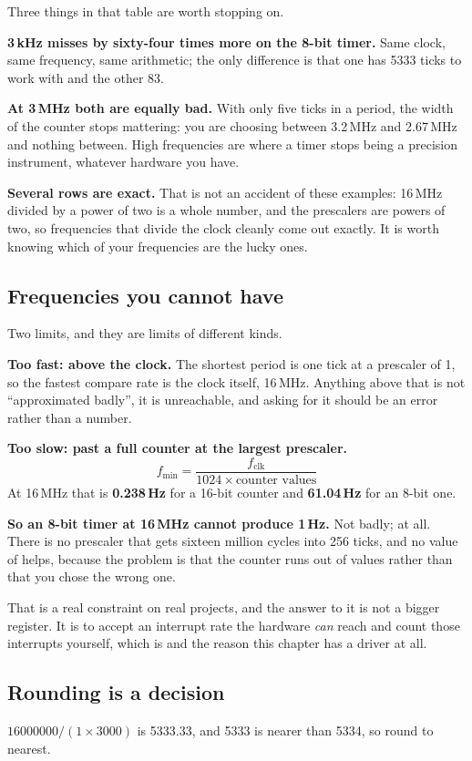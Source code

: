 Three things in that table are worth stopping on.

\textbf{3\,kHz misses by sixty-four times more on the 8-bit timer.} Same clock, same frequency, same
arithmetic; the only difference is that one has 5333 ticks to work with and the other 83.

\textbf{At 3\,MHz both are equally bad.} With only five ticks in a period, the width of the counter
stops mattering: you are choosing between 3.2\,MHz and 2.67\,MHz and nothing between. High
frequencies are where a timer stops being a precision instrument, whatever hardware you have.

\textbf{Several rows are exact.} That is not an accident of these examples: 16\,MHz divided by a
power of two is a whole number, and the prescalers are powers of two, so frequencies that divide
the clock cleanly come out exactly. It is worth knowing which of your frequencies are the lucky
ones.

\subsection{Frequencies you cannot have}
\label{c5:sec:cannot}
Two limits, and they are limits of different kinds.

\textbf{Too fast: above the clock.} The shortest period is one tick at a prescaler of 1, so the
fastest compare rate is the clock itself, 16\,MHz. Anything above that is not ``approximated
badly'', it is unreachable, and asking for it should be an error rather than a number.

\textbf{Too slow: past a full counter at the largest prescaler.}
\[
  f_{\min} = \frac{f_{\mathrm{clk}}}{1024 \times \text{counter values}}
\]
At 16\,MHz that is \textbf{0.238\,Hz} for a 16-bit counter and \textbf{61.04\,Hz} for an 8-bit
one.

\textbf{So an 8-bit timer at 16\,MHz cannot produce 1\,Hz.} Not badly; at all. There is no
prescaler that gets sixteen million cycles into 256 ticks, and no value of  helps,
because the problem is that the counter runs out of values rather than that you chose the wrong
one.

That is a real constraint on real projects, and the answer to it is not a bigger register. It is to
accept an interrupt rate the hardware \emph{can} reach and count those interrupts yourself, which is
 and the reason this chapter has a driver at all.

\subsection{Rounding is a decision}
\label{c5:sec:rounding}
$16000000 / (1 \times 3000)$ is 5333.33, and 5333 is nearer than 5334, so round to nearest.


